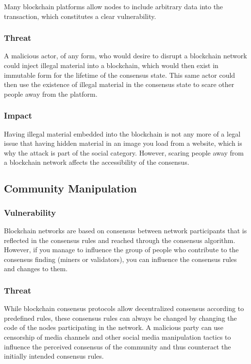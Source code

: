 \documentclass[11pt,a4paper,draft]{article}
\begin{document}
Many blockchain platforms allow nodes to include arbitrary data into the transaction, which constitutes a clear vulnerability.\\

\subsubsection{Threat}

A malicious actor, of any form, who would desire to disrupt a blockchain network could inject illegal material into a blockchain, which would then exist in immutable form for the lifetime of the consensus state. This same actor could then use the existence of illegal material in the consensus state to scare other people away from the platform.\\

\subsubsection{Impact}

Having illegal material embedded into the blockchain is not any more of a legal issue that having hidden material in an image you load from a website, which is why the attack is part of the social category. However, scaring people away from a blockchain network affects the accessibility of the consensus.\\

\subsection{Community Manipulation}

\subsubsection{Vulnerability}

Blockchain networks are based on consensus between network participants that is reflected in the consensus rules and reached through the consensus algorithm. However, if you manage to influence the group of people who contribute to the consensus finding (miners or validators), you can influence the consensus rules and changes to them.\\

\subsubsection{Threat}

While blockchain consensus protocols allow decentralized consensus according to predefined rules, these consensus rules can always be changed by changing the code of the nodes participating in the network. A malicious party can use censorship of media channels and other social media manipulation tactics to influence the perceived consensus of the community and thus counteract the initially intended consensus rules.\\
\end{document}
